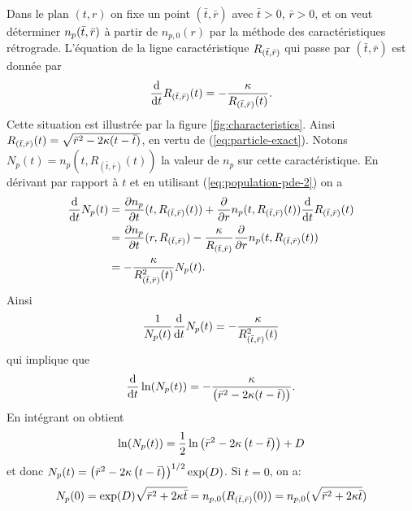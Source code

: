 Dans le plan $(t, r)$ on fixe un point $(\bar t, \bar r)$ avec $\bar t
> 0$, $\bar r > 0$, et on veut déterminer $n_p(\bar t, \bar
r)$ à partir de $n_{p,0}(r)$ par la méthode des caractéristiques rétrograde.
L'équation de la ligne caractéristique $R_{(\bar t, \bar r)}$ qui passe par $(\bar t,
\bar r)$ est donnée par
\begin{equation*}
\frac{\mathrm d}{\mathrm dt}R_{(\bar t, \bar r)}(t) =
-\frac{\kappa}{R_{(\bar t, \bar r)}(t)}.
\end{equation*}
Cette situation est illustrée par la figure \ref{fig:characteristics}.
Ainsi $R_{(\bar t, \bar r)}(t) = \sqrt{\bar r^2 - 2\kappa (t
  - \bar t)}$, en vertu de (\ref{eq:particle-exact}). Notons $N_p(t) =
n_p(t, R_{(\bar t, \bar r)}(t))$ la valeur de $n_p$ sur cette
caractéristique. En dérivant par rapport à $t$ et en utilisant
(\ref{eq:population-pde-2}) on a
\begin{align*}
  \frac{\mathrm d}{\mathrm dt}N_p(t) %
  &= \frac{\partial n_p}{\partial t}(t, \rcharacteristic(t)) %
  + \frac{\partial}{\partial r}n_p(t,\rcharacteristic(t)) %
    \frac{\mathrm d}{\mathrm dt}\rcharacteristic(t)\\
  &= \frac{\partial n_p}{\partial t}(r, \rcharacteristic) - \frac{\dissolutionrate}{\rcharacteristic}\frac{\partial}{\partial r} n_p(t, \rcharacteristic(t))\\
  &= -\frac{\dissolutionrate}{R_{(\bar t, \bar r)}^2(t)}N_p(t). %
\end{align*}
Ainsi
\begin{equation*}
  \frac{1}{N_p(t)}\frac{\mathrm d}{\mathrm dt}N_p(t) =
  -\frac{\kappa}{R^2_{(\bar t, \bar r)}(t)}
\end{equation*}
qui implique que
\begin{equation*}
  \frac{\mathrm d}{\mathrm dt}\ln(N_p(t)) =
  -\frac{\kappa}{\left( \bar r^2 - 2\kappa (t - \bar t) \right)}.
\end{equation*}
En intégrant on obtient
\begin{equation*}
  \ln(N_p(t)) = \frac{1}{2}\ln\left( \bar r^2 -
    2\kappa\left( t - \bar t \right) \right) + D
\end{equation*}
et donc
$N_p(t) = \left( \bar r^2 - 2\kappa\left( t - \bar t \right) \right)^{1/2} \exp(D)$. Si $t = 0$, on a:
\begin{equation*}
  N_p(0) = \exp(D)\sqrt{\bar r^2 +
    2\kappa \bar t} = n_{p,0}(R_{(\bar t, \bar r)}(0)) = n_{p,0}(\sqrt{\bar r^2 +
    2\kappa \bar t})
\end{equation*}
